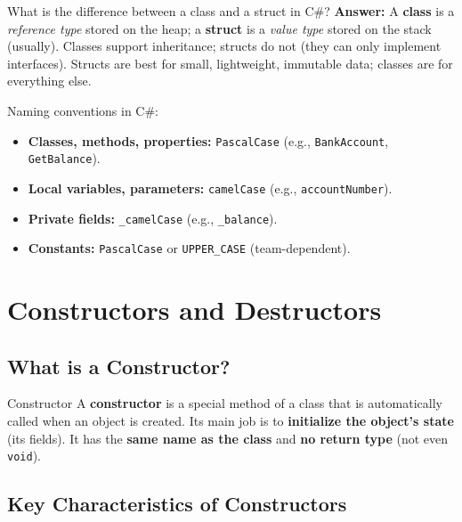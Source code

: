 \documentclass[11pt,a4paper]{article}
\begin{document}
\begin{intqBox}{What is the difference between a class and a struct in C\#?}
\textbf{Answer:} A \textbf{class} is a \textit{reference type} stored on the heap; a \textbf{struct} is a \textit{value type} stored on the stack (usually). Classes support inheritance; structs do not (they can only implement interfaces). Structs are best for small, lightweight, immutable data; classes are for everything else.
\end{intqBox}

\begin{tipBox}
Naming conventions in C\#:
\begin{itemize}[leftmargin=*]
    \item \textbf{Classes, methods, properties:} \texttt{PascalCase} (e.g., \texttt{BankAccount}, \texttt{GetBalance}).
    \item \textbf{Local variables, parameters:} \texttt{camelCase} (e.g., \texttt{accountNumber}).
    \item \textbf{Private fields:} \texttt{\_camelCase} (e.g., \texttt{\_balance}).
    \item \textbf{Constants:} \texttt{PascalCase} or \texttt{UPPER\_CASE} (team-dependent).
\end{itemize}
\end{tipBox}

\clearpage
\section{Constructors and Destructors}

\subsection{What is a Constructor?}

\begin{defnBox}{Constructor}
A \textbf{constructor} is a special method of a class that is automatically called when an object is created. Its main job is to \textbf{initialize the object's state} (its fields). It has the \textbf{same name as the class} and \textbf{no return type} (not even \texttt{void}).
\end{defnBox}

\subsection{Key Characteristics of Constructors}
\end{document}
